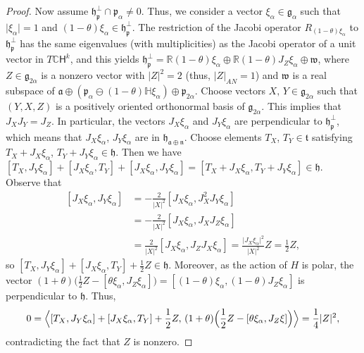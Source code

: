 \documentclass[12pt, a4paper]{amsart}
\newcommand{\g}{\mathfrak}
\newcommand{\s}{\mathsf}
\newcommand{\R}{\mathbb{R}}
\newcommand{\C}{\mathbb{C}}
\renewcommand{\H}{\mathbb{H}}
\theoremstyle{definition}
\begin{document}
\begin{proof}
Now assume $\g{h}_{\g{p}}^\perp\cap\g{p}_\alpha\neq 0$.
Thus, we consider a vector $\xi_\alpha \in \g{g}_\alpha$ such that $\lvert \xi_\alpha \rvert = 1$ and
$(1-\theta)\xi_\alpha\in \g{h}_{\g{p}}^\perp$.
The restriction of the Jacobi operator $R_{(1-\theta)\xi_\alpha}$ to $\g{h}_{\g{p}}^\perp$ has the same eigenvalues (with multiplicities) as the Jacobi operator of a unit vector in $T\C\s{H}^k$, and this yields $\g{h}_{\g{p}}^\perp=\R (1-\theta) \xi_\alpha \oplus \R (1-\theta)J_Z \xi_\alpha \oplus \g{w}$, 
where $Z\in \g{g}_{2\alpha}$ is a nonzero vector with $\lvert Z\rvert^2=2$ (thus, $\lvert Z\rvert_{AN}=1$)
and $\g{w}$ is a real subspace of $\g{a}\oplus(\g{p}_\alpha\ominus (1-\theta)\H\xi_\alpha)\oplus\g{p}_{2\alpha}$.
Choose vectors $X,\,Y\in\g{g}_{2\alpha}$ such that $(Y,X,Z)$ is a positively oriented orthonormal basis of $\g{g}_{2\alpha}$.
This implies that $J_X J_Y = J_Z$.
In particular, the vectors $J_X \xi_\alpha$ and $J_Y \xi_\alpha$ are perpendicular to 
$\g{h}_{\g{p}}^\perp$, which means that $J_X \xi_\alpha$, $J_Y \xi_\alpha$ are in $\g{h}_{\g{a}\oplus\g{n}}$.
Choose elements $T_X$, $T_Y\in \g{t}$ satisfying $T_X+J_X \xi_\alpha$, $T_Y + J_Y \xi_\alpha\in \g{h}$.
Then we have 
$[T_X,J_Y\xi_\alpha]+[J_X \xi_\alpha,T_Y]+[J_X\xi_\alpha,J_Y\xi_\alpha]
=[T_X+J_X \xi_\alpha,T_Y+J_Y \xi_\alpha]\in \g{h}$.
Observe that
\begin{equation}\label{eq:bracket-of-js}
\begin{aligned}%
{}[J_X\xi_\alpha,J_Y\xi_\alpha]
&{}=-\frac{2}{\lvert X \rvert^2}[J_X\xi_\alpha,J_X^2J_Y\xi_\alpha]\\
&{}=-\frac{2}{\lvert X \rvert^2}[J_X\xi_\alpha,J_XJ_Z\xi_\alpha] \\
&{}={}\frac{2}{\lvert X \rvert^2}[J_X \xi_\alpha,J_Z J_X \xi_\alpha] 
= \frac{\lvert J_X \xi_\alpha \rvert^2}{\lvert X \rvert^2} Z=\frac{1}{2}Z,
\end{aligned}
\end{equation}
so $[T_X,J_Y\xi_\alpha]+[J_X \xi_\alpha,T_Y]+\tfrac{1}{2}Z\in\g{h}$.
Moreover, as the action of $H$ is polar, the vector
$(1+\theta)\bigl(\tfrac{1}{2}Z-[\theta\xi_\alpha,J_Z\xi_\alpha]\bigr)
=[(1-\theta)\xi_\alpha,(1-\theta)J_Z \xi_\alpha]$ is perpendicular to $\g{h}$.
Thus,
\begin{equation*}
0= \Bigl< [T_X,J_Y\xi_\alpha]+[J_X \xi_\alpha,T_Y]+\frac{1}{2}Z,\,
(1+\theta)\Bigl(\frac{1}{2}Z-[\theta\xi_\alpha,J_Z\xi]\Bigr) \Bigr>
=\frac{1}{4}\lvert Z \rvert^2,
\end{equation*}
contradicting the fact that $Z$ is nonzero.


\end{proof}
\end{document}
